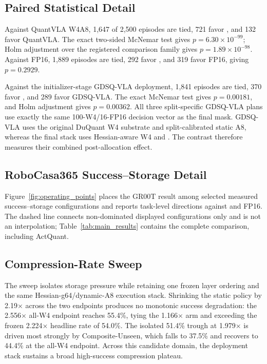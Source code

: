 \subsection{Paired Statistical Detail}

Against QuantVLA W4A8, 1,647 of 2,500 episodes are tied, 721 favor \method, and 132 favor QuantVLA. The exact two-sided McNemar test gives $p=6.30\times10^{-99}$; Holm adjustment over the registered comparison family gives $p=1.89\times10^{-98}$. Against FP16, 1,889 episodes are tied, 292 favor \method, and 319 favor FP16, giving $p=0.2929$.

Against the initializer-stage GDSQ-VLA deployment, 1,841 episodes are tied, 370 favor \method, and 289 favor GDSQ-VLA. The exact McNemar test gives $p=0.00181$, and Holm adjustment gives $p=0.00362$. All three split-specific GDSQ-VLA plans use exactly the same 100-W4/16-FP16 decision vector as the final mask. GDSQ-VLA uses the original DuQuant W4 substrate and split-calibrated static A8, whereas the final stack uses Hessian-aware W4 and \dyrange. The contrast therefore measures their combined post-allocation effect.

\subsection{RoboCasa365 Success--Storage Detail}
\label{sec:operating_points_detail}



Figure~\ref{fig:operating_points} places the GR00T result among selected measured success--storage configurations and reports task-level directions against \quantvla and FP16. The dashed line connects non-dominated displayed configurations only and is not an interpolation; Table~\ref{tab:main_results} contains the complete comparison, including ActQuant.

\subsection{Compression-Rate Sweep}
\label{sec:compression_sweep}



The sweep isolates storage pressure while retaining one frozen layer ordering and the same Hessian-g64/dynamic-A8 execution stack. Shrinking the static policy by 2.19$\times$ across the two endpoints produces no monotonic success degradation: the 2.556$\times$ all-W4 endpoint reaches 55.4\%, tying the 1.166$\times$ arm and exceeding the frozen 2.224$\times$ headline rate of 54.0\%. The isolated 51.4\% trough at 1.979$\times$ is driven most strongly by Composite-Unseen, which falls to 37.5\% and recovers to 44.4\% at the all-W4 endpoint. Across this candidate domain, the deployment stack sustains a broad high-success compression plateau.

